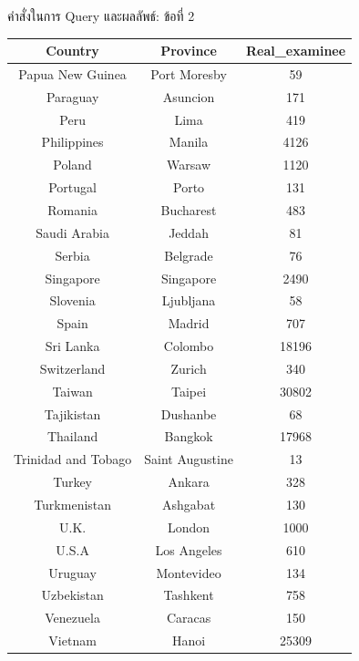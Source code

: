 \documentclass{beamer}
\begin{document}
\begin{frame}[fragile]{คำสั่งในการ Query และผลลัพธ์: ข้อที่ 2}
  \begin{tiny}
  \begin{table}
  \begin{tabular}{|c|c|c|}
  \hline
  \textbf{Country} & \textbf{Province} & \textbf{Real\_examinee} \\
  \hline
  Papua New Guinea & Port Moresby & 59 \\
  Paraguay & Asuncion & 171 \\
  Peru & Lima & 419 \\
  Philippines & Manila & 4126 \\
  Poland & Warsaw & 1120 \\
  Portugal & Porto & 131 \\
  Romania & Bucharest & 483 \\
  Saudi Arabia & Jeddah & 81 \\
  Serbia & Belgrade & 76 \\
  Singapore & Singapore & 2490 \\
  Slovenia & Ljubljana & 58 \\
  Spain & Madrid & 707 \\
  Sri Lanka & Colombo & 18196 \\
  Switzerland & Zurich & 340 \\
  Taiwan & Taipei & 30802 \\
  Tajikistan & Dushanbe & 68 \\
  Thailand & Bangkok & 17968 \\
  Trinidad and Tobago & Saint Augustine & 13 \\
  Turkey & Ankara & 328 \\
  Turkmenistan & Ashgabat & 130 \\
  U.K. & London & 1000 \\
  U.S.A & Los Angeles & 610 \\
  Uruguay & Montevideo & 134 \\
  Uzbekistan & Tashkent & 758 \\
  Venezuela & Caracas & 150 \\
  Vietnam & Hanoi & 25309 \\
  \hline
  \end{tabular}
  \end{table}
  \end{tiny}
\end{frame}
\end{document}
